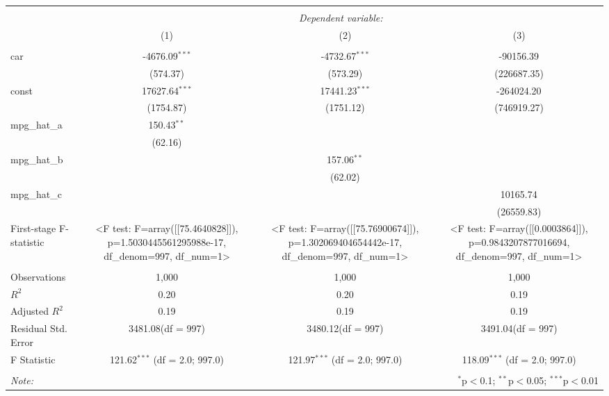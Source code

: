 \begin{table}[!htbp] \centering
\begin{tabular}{@{\extracolsep{5pt}}lccc}
\\[-1.8ex]\hline
\hline \\[-1.8ex]
& \multicolumn{3}{c}{\textit{Dependent variable:}} \
\cr \cline{3-4}
\\[-1.8ex] & (1) & (2) & (3) \\
\hline \\[-1.8ex]
 car & -4676.09$^{***}$ & -4732.67$^{***}$ & -90156.39$^{}$ \\
  & (574.37) & (573.29) & (226687.35) \\
 const & 17627.64$^{***}$ & 17441.23$^{***}$ & -264024.20$^{}$ \\
  & (1754.87) & (1751.12) & (746919.27) \\
 mpg_hat_a & 150.43$^{**}$ & & \\
  & (62.16) & & \\
 mpg_hat_b & & 157.06$^{**}$ & \\
  & & (62.02) & \\
 mpg_hat_c & & & 10165.74$^{}$ \\
  & & & (26559.83) \\
 First-stage F-statistic & <F test: F=array([[75.4640828]]), p=1.5030445561295988e-17, df_denom=997, df_num=1> & <F test: F=array([[75.76900674]]), p=1.302069404654442e-17, df_denom=997, df_num=1> & <F test: F=array([[0.0003864]]), p=0.9843207877016694, df_denom=997, df_num=1> \\
\hline \\[-1.8ex]
 Observations & 1,000 & 1,000 & 1,000 \\
 $R^2$ & 0.20 & 0.20 & 0.19 \\
 Adjusted $R^2$ & 0.19 & 0.19 & 0.19 \\
 Residual Std. Error & 3481.08(df = 997) & 3480.12(df = 997) & 3491.04(df = 997)  \\
 F Statistic & 121.62$^{***}$ (df = 2.0; 997.0) & 121.97$^{***}$ (df = 2.0; 997.0) & 118.09$^{***}$ (df = 2.0; 997.0) \\
\hline
\hline \\[-1.8ex]
\textit{Note:} & \multicolumn{3}{r}{$^{*}$p$<$0.1; $^{**}$p$<$0.05; $^{***}$p$<$0.01} \\
\end{tabular}
\end{table}